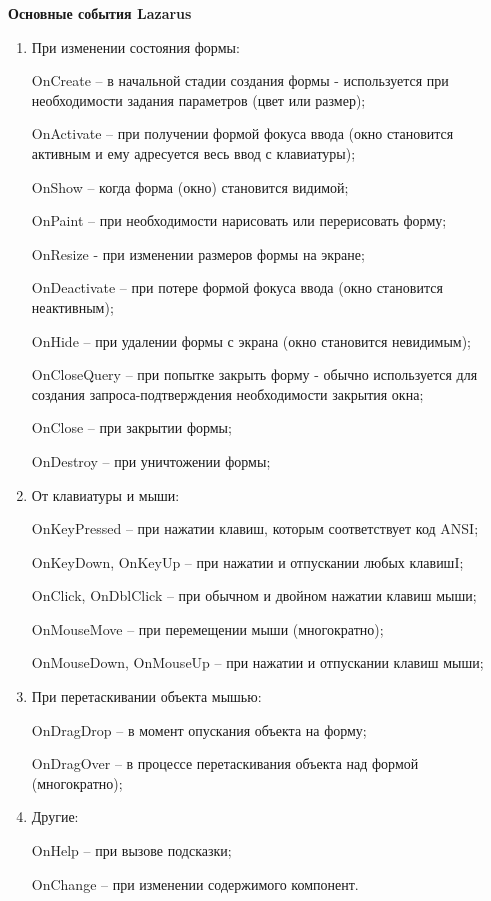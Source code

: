 {\bf{Основные события Lazarus}}
\begin{enumerate}
\item При изменении состояния формы:

OnCreate – в начальной стадии создания формы - используется при необходимости задания параметров (цвет или размер);

OnActivate – при получении формой фокуса ввода (окно становится активным и ему адресуется весь ввод с клавиатуры);

OnShow – когда форма (окно) становится видимой;

OnPaint – при необходимости нарисовать или перерисовать форму;

OnResize - при изменении размеров формы на экране;

OnDeactivate – при потере формой фокуса ввода (окно становится неактивным);

OnHide – при удалении формы с экрана (окно становится невидимым); 

OnCloseQuery – при попытке закрыть форму - обычно используется для создания 
запроса-подтверждения необходимости закрытия окна;

OnClose – при закрытии формы;

OnDestroy – при уничтожении формы;
\item От клавиатуры и мыши:

OnKeyPressed – при нажатии клавиш, которым соответствует код ANSI;

OnKeyDown, OnKeyUp – при нажатии и отпускании любых клавишI;

OnClick, OnDblClick – при обычном и двойном нажатии клавиш мыши;

OnMouseMove – при перемещении мыши (многократно);

OnMouseDown, OnMouseUp – при нажатии и отпускании клавиш мыши;
\item При перетаскивании объекта мышью:

OnDragDrop – в момент опускания объекта на форму;

OnDragOver – в процессе перетаскивания объекта над формой (многократно);
\item Другие:

OnHelp – при вызове подсказки;

OnChange – при изменении содержимого компонент.
\end{enumerate}


